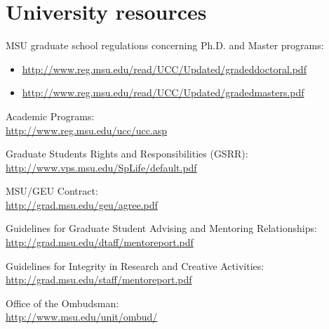\section{University resources}

\vspace{3mm}
\noindent
MSU graduate school regulations concerning Ph.D. and Master  programs:
\begin{itemize}
\item \url{http://www.reg.msu.edu/read/UCC/Updated/gradeddoctoral.pdf}
\item \url{http://www.reg.msu.edu/read/UCC/Updated/gradedmasters.pdf}
\end{itemize}

\vspace{3mm}
\noindent
Academic Programs: \\
	\url{http://www.reg.msu.edu/ucc/ucc.asp}

\vspace{3mm}
\noindent
Graduate Students Rights and Responsibilities (GSRR): \\
	\url{http://www.vps.msu.edu/SpLife/default.pdf}

\vspace{3mm}
\noindent
MSU/GEU Contract:\\
	\url{http://grad.msu.edu/geu/agree.pdf}

\vspace{3mm}
\noindent
Guidelines for Graduate Student Advising and Mentoring Relationships:\\
	\url{http://grad.msu.edu/dtaff/mentoreport.pdf}

\vspace{3mm}
\noindent
Guidelines for Integrity in Research and Creative Activities:\\
	\url{http://grad.msu.edu/staff/mentoreport.pdf}

\vspace{3mm}
\noindent
Office of the Ombudsman:\\
	\url{http://www.msu.edu/unit/ombud/}
